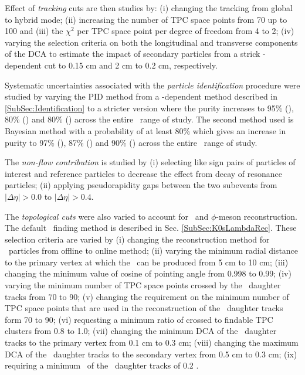 Effect of {\it tracking} cuts are then studies by: (i) changing the tracking from global to hybrid mode; (ii) increasing the number of TPC space points from 70 up to 100 and (iii) the $\chi^{2}$ per TPC space point per degree of freedom from 4 to 2; (iv) varying the selection criteria on both the longitudinal and transverse components of the DCA to estimate the impact of secondary particles from a strick \pT-dependent cut to 0.15 cm and 2 cm to 0.2 cm, respectively.

Systematic uncertainties associated with the {\it particle identification} procedure were studied by varying the PID method from a \pT-dependent method described in \ref{SubSec:Identification} to a stricter version where the purity increases to 95\% (\pion), 80\% (\kaon) and 80\% (\proton) across the entire \pT~range of study. The second method used is Bayesian method with a probability of at least 80\% which gives an increase in purity to 97\% (\pion), 87\% (\kaon) and 90\% (\proton) across the entire \pT~range of study. 

The {\it non-flow contribution} is studied by (i) selecting like sign pairs of particles of interest and reference particles to decrease the effect from decay of resonance particles; (ii) applying pseudorapidity gaps between the two subevents from $|\Delta\eta|>0.0$ to $|\Delta\eta|>0.4$.

The {\it topological cuts} were also varied to account for \vo~and $\phi$-meson reconstruction. The default \vo~finding method is described in Sec. \ref{SubSec:K0sLambdaRec}. These selection criteria are varied by (i) changing the reconstruction method for \vo~particles from offline to online method; 
(ii) varying the minimum radial distance to the primary vertex at which the \vo~can be produced from 5 cm to 10 cm; (iii) changing the minimum value of cosine of pointing angle from 0.998 to 0.99; (iv) varying the minimum number of TPC space points crossed by the \vo~daughter tracks from 70 to 90; (v) changing the requirement on the minimum number of TPC space points that are used in the reconstruction of the \vo~daughter tracks form 70 to 90; (vi) requesting a minimum ratio of crossed to findable TPC clusters from 0.8 to 1.0; (vii) changing the minimum DCA of the \vo~daughter tracks to the primary vertex from 0.1 cm to 0.3 cm; (viii) changing the maximum DCA of the \vo~daughter tracks to the secondary vertex from 0.5 cm to 0.3 cm; (ix) requiring a minimum \pT~of the \vo~daughter tracks of 0.2 \GeV. \\

